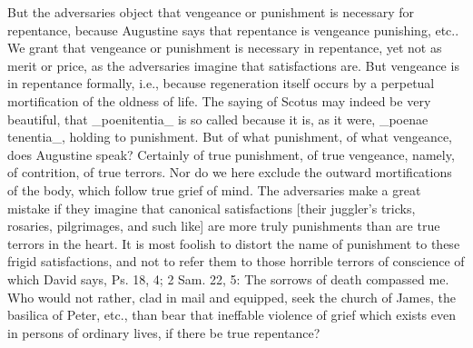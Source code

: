 But the adversaries object that vengeance or punishment is necessary
for repentance, because Augustine says that repentance is vengeance
punishing, etc..  We grant that vengeance or punishment is necessary
in repentance, yet not as merit or price, as the adversaries imagine
that satisfactions are.  But vengeance is in repentance formally, i.e.,
because regeneration itself occurs by a perpetual mortification of
the oldness of life.  The saying of Scotus may indeed be very
beautiful, that _poenitentia_ is so called because it is, as it were,
_poenae tenentia_, holding to punishment.  But of what punishment, of
what vengeance, does Augustine speak?  Certainly of true punishment,
of true vengeance, namely, of contrition, of true terrors.  Nor do we
here exclude the outward mortifications of the body, which follow
true grief of mind.  The adversaries make a great mistake if they
imagine that canonical satisfactions [their juggler's tricks,
rosaries, pilgrimages, and such like] are more truly punishments than
are true terrors in the heart.  It is most foolish to distort the
name of punishment to these frigid satisfactions, and not to refer
them to those horrible terrors of conscience of which David says, Ps.
18, 4; 2 Sam. 22, 5: The sorrows of death compassed me.  Who would
not rather, clad in mail and equipped, seek the church of James, the
basilica of Peter, etc., than bear that ineffable violence of grief
which exists even in persons of ordinary lives, if there be true
repentance?

